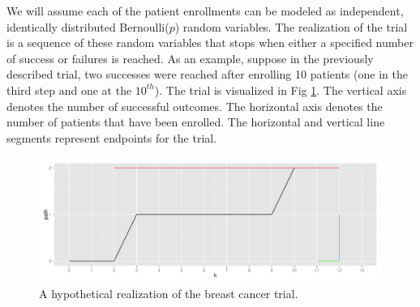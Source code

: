 \documentclass[12pt]{article}         %
\begin{document}
We will assume each of the patient enrollments can be modeled as independent, identically distributed Bernoulli($p$) random variables. The realization of the trial is a sequence of these random variables that stops when either a specified number of success or failures is reached. As an example, suppose in the previously described trial, two successes were reached after enrolling 10 patients (one in the third step and one at the $10^{th}$). The trial is visualized in Fig \ref{fig:kane_viz}. The vertical axis denotes the number of successful outcomes. The horizontal axis denotes the number of patients that have been enrolled. The horizontal and vertical line segments represent endpoints for the trial. 

\begin{figure}[ht]
\includegraphics[width=\textwidth]{KanePlot.pdf}
\caption{
A hypothetical realization of the breast cancer trial.
}
\label{fig:kane_viz}
\end{figure}

\end{document}
